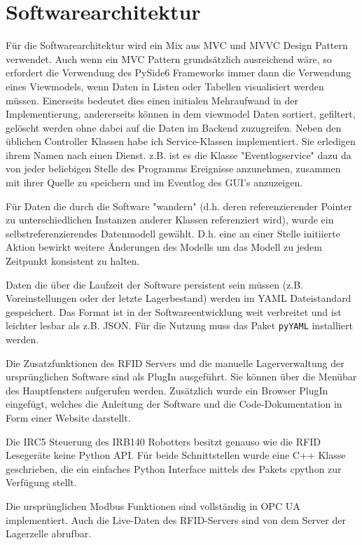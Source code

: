 \chapter{Softwarearchitektur}\label{Software}

Für die Softwarearchitektur wird ein Mix aus MVC und MVVC Design Pattern verwendet. 
Auch wenn ein MVC Pattern grundsätzlich ausreichend wäre, so erfordert die Verwendung des PySide6 Frameworks immer 
dann die Verwendung eines Viewmodels, wenn Daten in Listen oder Tabellen visualisiert werden müssen. 
Einerseits bedeutet dies einen initialen Mehraufwand in der Implementierung, andererseits können in dem viewmodel 
Daten sortiert, gefiltert, gelöscht werden ohne dabei auf die Daten im Backend zuzugreifen. 
Neben den üblichen Controller Klassen habe ich Service-Klassen implementiert. Sie erledigen ihrem Namen nach einen Dienst. 
z.B. ist es die Klasse "Eventlogservice" dazu da von jeder beliebigen Stelle des Programms Ereignisse anzunehmen, zusammen mit ihrer 
Quelle zu speichern und im Eventlog des GUI's anzuzeigen. 

Für Daten die durch die Software "wandern" (d.h. deren referenzierender Pointer zu unterschiedlichen Instanzen anderer Klassen referenziert wird), 
wurde ein selbstreferenzierendes Datenmodell gewählt. D.h. eine an einer Stelle initiierte Aktion bewirkt weitere Änderungen des Modells um
das Modell zu jedem Zeitpunkt konsistent zu halten.

Daten die über die Laufzeit der Software persistent sein müssen (z.B. Voreinstellungen oder der letzte Lagerbestand) werden im YAML
Dateistandard gespeichert. Das Format ist in der Softwareentwicklung weit verbreitet und ist leichter lesbar als z.B. JSON. 
Für die Nutzung muss das Paket \verb|pyYAML| installiert werden.

Die Zusatzfunktionen des RFID Servers und die manuelle Lagerverwaltung der ursprünglichen Software sind als PlugIn ausgeführt. 
Sie können über die Menübar des Hauptfensters aufgerufen werden. Zusätzlich wurde ein Browser PlugIn eingefügt, welches die
Anleitung der Software und die Code-Dokumentation in Form einer Website darstellt. 

Die IRC5 Steuerung des IRB140 Robotters besitzt genauso wie die RFID Lesegeräte keine Python API. Für beide Schnittstellen wurde eine
C++ Klasse geschrieben, die ein einfaches Python Interface mittels des Pakets cpython zur Verfügung stellt. 

Die ursprünglichen Modbus Funktionen sind vollständig in OPC UA implementiert. 
Auch die Live-Daten des RFID-Servers sind von dem Server der Lagerzelle abrufbar. 

